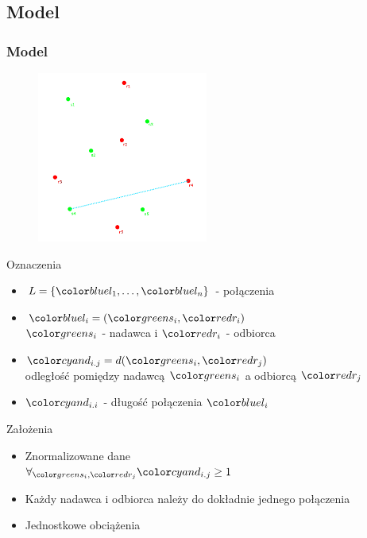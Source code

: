 \documentclass[polish, t,10pt]{beamer}
\begin{document}
\subsection{Model}
    \begin{frame}
        \frametitle{Model}
        \begin{figure}
            \includegraphics[width=0.5\textwidth]{pictures/model-variables.png}
        \end{figure}
        Oznaczenia
        \begin{itemize}
            \item $L = \{\lo, \ldots, \ln\}$ - połączenia
            \item $\li = (\si, \ri)$ \\ $\si$ - nadawca i $\ri$ - odbiorca
            \item $\dij = d(\si, \rj)$ \\ odległość pomiędzy nadawcą $\si$ a odbiorcą $\rj$
            \item $\dii$ - długość połączenia $\li$
        \end{itemize}
        Założenia
        \begin{itemize}
            \item Znormalizowane dane \\ $\forall_{\si, \rj} \dij \geq 1$
            \item Każdy nadawca i odbiorca należy do dokładnie jednego połączenia
            \item Jednostkowe obciążenia
        \end{itemize}
    \end{frame}
\end{document}
